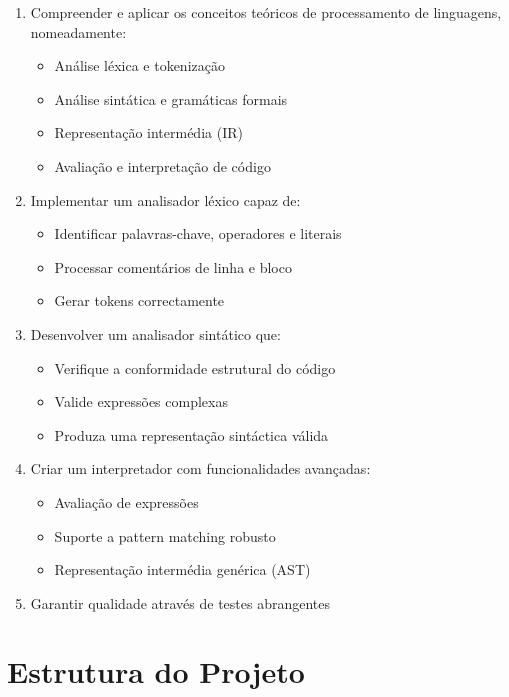 \documentclass[11pt,a4paper]{report}
\begin{document}
\begin{enumerate}
    \item Compreender e aplicar os conceitos teóricos de processamento de linguagens, nomeadamente:
    \begin{itemize}
        \item Análise léxica e tokenização
        \item Análise sintática e gramáticas formais
        \item Representação intermédia (IR)
        \item Avaliação e interpretação de código
    \end{itemize}
    
    \item Implementar um analisador léxico capaz de:
    \begin{itemize}
        \item Identificar palavras-chave, operadores e literais
        \item Processar comentários de linha e bloco
        \item Gerar tokens correctamente
    \end{itemize}
    
    \item Desenvolver um analisador sintático que:
    \begin{itemize}
        \item Verifique a conformidade estrutural do código
        \item Valide expressões complexas
        \item Produza uma representação sintáctica válida
    \end{itemize}
    
    \item Criar um interpretador com funcionalidades avançadas:
    \begin{itemize}
        \item Avaliação de expressões
        \item Suporte a pattern matching robusto
        \item Representação intermédia genérica (AST)
    \end{itemize}
    
    \item Garantir qualidade através de testes abrangentes
\end{enumerate}

\chapter{Estrutura do Projeto}
\end{document}
